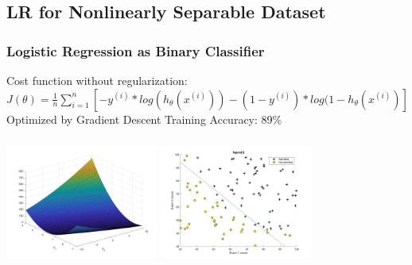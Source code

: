 \subsection{LR for Nonlinearly Separable Dataset}
\begin{frame}
\frametitle{Logistic Regression as Binary Classifier}
Cost function without regularization: \newline\newline
$J(\theta)=\frac{1}{n}\sum\limits_{i=1}^n[-y^{(i)}*log(h_\theta(x^{(i)}))-(1-y^{(i)})*log(1-h_\theta(x^{(i)})]$\newline\newline
Optimized by Gradient Descent\newline\newline
Training Accuracy: 89\%
\includegraphics[width=5cm,height=5cm,keepaspectratio]{pictures/0_optimization_result_in_3-d_graph}
\includegraphics[width=5cm,height=5cm,keepaspectratio]{pictures/2_plotData1_decision_boundary}
\end{frame}

